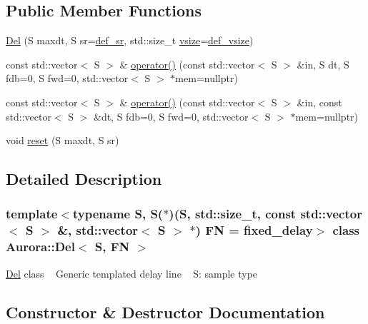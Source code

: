 \subsection*{Public Member Functions}
\begin{DoxyCompactItemize}
\item 
\hyperlink{class_aurora_1_1_del_a06a164e69592f0a9cef68a571b8157d1}{Del} (S maxdt, S sr=\hyperlink{namespace_aurora_ad49263d809bea98dd422e95bc91bc03e}{def\+\_\+sr}, std\+::size\+\_\+t \hyperlink{class_aurora_1_1_snd_base_af9e21aaf411b17f7a8221c991ce5d291}{vsize}=\hyperlink{namespace_aurora_afaaddf667a06e7ce23c667a8b7295263}{def\+\_\+vsize})
\item 
const std\+::vector$<$ S $>$ \& \hyperlink{class_aurora_1_1_del_a8ef3facc305826e66977b633bf5a6f15}{operator()} (const std\+::vector$<$ S $>$ \&in, S dt, S fdb=0, S fwd=0, std\+::vector$<$ S $>$ $\ast$mem=nullptr)
\item 
const std\+::vector$<$ S $>$ \& \hyperlink{class_aurora_1_1_del_a3e02b9da60ffefe345b905a55c26fa16}{operator()} (const std\+::vector$<$ S $>$ \&in, const std\+::vector$<$ S $>$ \&dt, S fdb=0, S fwd=0, std\+::vector$<$ S $>$ $\ast$mem=nullptr)
\item 
void \hyperlink{class_aurora_1_1_del_adcb695eca560d6ead399a8bbafef9025}{reset} (S maxdt, S sr)
\end{DoxyCompactItemize}


\subsection{Detailed Description}
\subsubsection*{template$<$typename S, S($\ast$)(\+S, std\+::size\+\_\+t, const std\+::vector$<$ S $>$ \&, std\+::vector$<$ S $>$ $\ast$) FN = fixed\+\_\+delay$>$\newline
class Aurora\+::\+Del$<$ S, F\+N $>$}

\hyperlink{class_aurora_1_1_del}{Del} class ~\newline
Generic templated delay line ~\newline
S\+: sample type 

\subsection{Constructor \& Destructor Documentation}
\mbox{\label{class_aurora_1_1_del_a06a164e69592f0a9cef68a571b8157d1}} 
